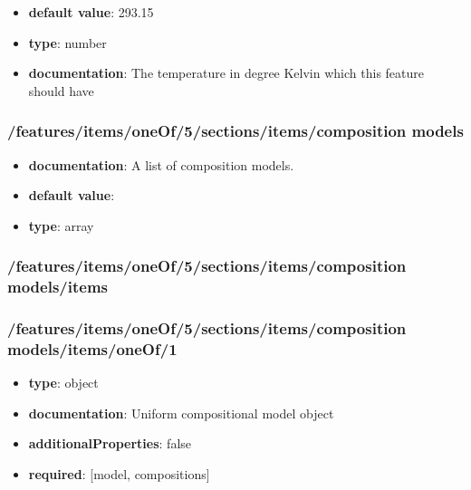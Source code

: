\begin{itemize}\item {\bf default value}: 293.15
\item {\bf type}: number
\item {\bf documentation}: The temperature in degree Kelvin which this feature should have
\end{itemize}\subsubsection{/features/items/oneOf/5/sections/items/composition models}
\begin{itemize}\item {\bf documentation}: A list of composition models.
\item {\bf default value}: 
\item {\bf type}: array
\end{itemize}\subsubsection{/features/items/oneOf/5/sections/items/composition models/items}

\subsubsection{/features/items/oneOf/5/sections/items/composition models/items/oneOf/1}
\begin{itemize}\item {\bf type}: object
\item {\bf documentation}: Uniform compositional model object
\item {\bf additionalProperties}: false
\item {\bf required}: [model, compositions]\end{itemize}
